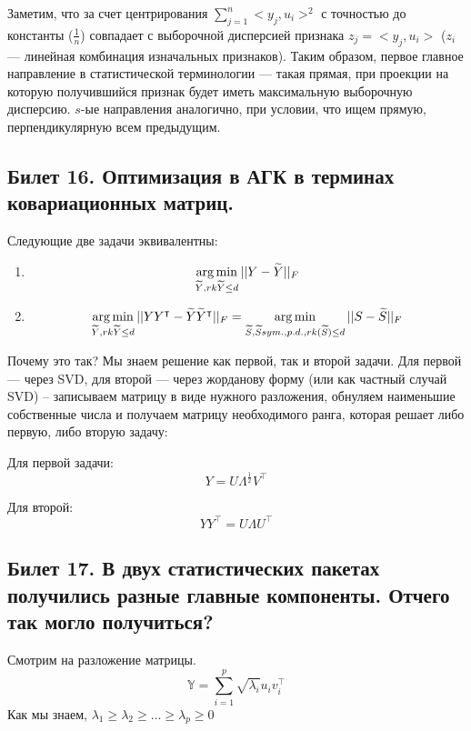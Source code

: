 Заметим, что за счет центрирования $\sum \limits_{j=1}^n <y_j, u_i>^2$ с точностью до константы ($\frac{1}{n}$) совпадает с выборочной дисперсией признака $z_j = <y_j, u_i>$ ($z_i$ — линейная комбинация изначальных признаков). Таким образом, 
первое главное направление в статистической терминологии — такая прямая, при проекции на которую получившийся признак будет иметь максимальную выборочную дисперсию. 
$s$-ые направления аналогично, при условии, что ищем прямую, перпендикулярную всем предыдущим.

\subsection{Билет 16. Оптимизация в АГК в терминах ковариационных матриц.}

\begin{thm}
Следующие две задачи эквивалентны:
\begin{enumerate}
\item
$$  \operatorname*{arg\,min}\limits_{\widetilde{Y}, rk\widetilde{Y} \leq d} ||Y - \widetilde{Y}||_{F} $$
\item $$\operatorname*{arg\,min}\limits_{\widetilde{Y}, rk\widetilde{Y} \leq d} ||YY^{\intercal} - \widetilde{Y}\widetilde{Y}^{\intercal}||_{F} = \operatorname*{arg\,min}\limits_{\widetilde{S}, \widetilde{S} sym.,p.d., rk(\widetilde{S}) \leq d} ||S - \widetilde{S}||_{F}$$
\end{enumerate}
\end{thm}

Почему это так? Мы знаем решение как первой, так и второй задачи. Для первой — через SVD, для второй — через жорданову форму (или как частный случай SVD) – записываем матрицу в виде нужного разложения, обнуляем наименьшие собственные числа и получаем матрицу необходимого ранга, которая решает либо первую, либо вторую задачу:

Для первой задачи:
$$ Y = U\Lambda^{\frac{1}{2}} V^{\intercal}$$

Для второй:
$$ YY^{\intercal} = U\Lambda U^{\intercal}$$



\subsection{Билет 17. В двух статистических пакетах получились разные главные компоненты. Отчего так могло
получиться?}
Смотрим на разложение матрицы. 
$$ \mathbb{Y} = \sum \limits_{i=1}^{p} \sqrt{\lambda_i}u_iv_i^{\intercal}$$
Как мы знаем, $\lambda_1 \geq \lambda_2\geq…\geq \lambda_p\geq0$

